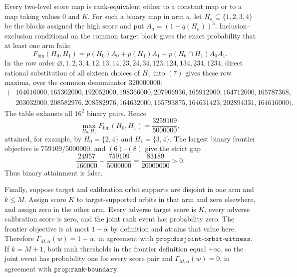 Every two-level score map is rank-equivalent either to a constant map or to a map taking values \(0\) and \(K\). For such a binary map in arm \(a\), let \(H_a\subseteq\{1,2,3,4\}\) be the blocks assigned the high score and put \(A_a=(1-q(H_a))^3\). Inclusion--exclusion conditional on the common target block gives the exact probability that at least one arm fails:
\[F_{\mathrm{bin}}(H_0,H_1)=p(H_0)A_0+p(H_1)A_1-p(H_0\cap H_1)A_0A_1.\tag{7}\]
In the row order \(\varnothing,1,2,3,4,12,13,14,23,24,34,123,124,134,234,1234\), direct rational substitution of all sixteen choices of \(H_1\) into \((7)\) gives these row maxima, over the common denominator \(320000000\):
\[\begin{split}
(&164616000,165302000,192052000,198366000,207906936,165912000,164712000,165787368,\\
&203032000,208582976,208582976,164632000,165793875,164631423,202894331,164616000).
\end{split}\tag{8}\]
The table exhausts all \(16^2\) binary pairs. Hence
\[\max_{H_0,H_1}F_{\mathrm{bin}}(H_0,H_1)=\frac{3259109}{5000000},\]
attained, for example, by \(H_0=\{2,4\}\) and \(H_1=\{3,4\}\). The largest binary frontier objective is \(759109/5000000\), and \((6)\)--\((8)\) give the strict gap
\[\frac{24957}{160000}-\frac{759109}{5000000}=\frac{83189}{20000000}>0.\]
Thus binary attainment is false.

Finally, suppose target and calibration orbit supports are disjoint in one arm and \(k\le M\). Assign score \(K\) to target-supported orbits in that arm and zero elsewhere, and assign zero in the other arm. Every adverse target score is \(K\), every adverse calibration score is zero, and the joint rank event has probability zero. The frontier objective is at most \(1-\alpha\) by definition and attains that value here. Therefore \(\Gamma_{M,\alpha}(w)=1-\alpha\), in agreement with \(\texttt{prop:disjoint-orbit-witness}\). If \(k=M+1\), both rank thresholds in the frontier definition equal \(+\infty\), so the joint event has probability one for every score pair and \(\Gamma_{M,\alpha}(w)=0\), in agreement with \(\texttt{prop:rank-boundary}\).